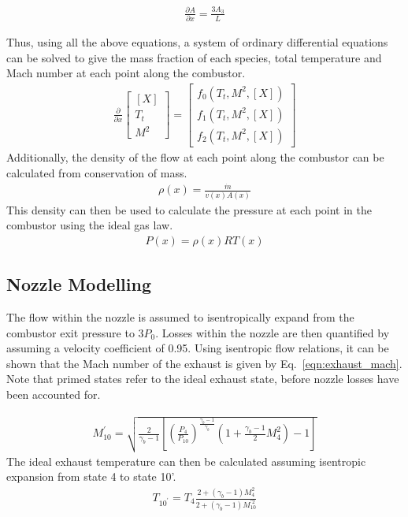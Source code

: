 \documentclass[a4paper]{article}
\begin{document}
\begin{align}
    \frac{\partial A}{\partial x} = \frac{3A_3}{L}
\end{align}

Thus, using all the above equations, a system of ordinary differential equations can be solved to give the mass fraction of each species, total temperature and Mach number at each point along the combustor.
\begin{align}
    \frac{\partial}{\partial x} 
    \begin{bmatrix}
    \left[ X \right] \\
    T_t\\
    M^2
    \end{bmatrix}
    =
    \begin{bmatrix}
        f_0 \left(T_t, M^2, \left[ X \right]\right)\\
        f_1 \left(T_t, M^2, \left[ X \right]\right)\\
        f_2 \left(T_t, M^2, \left[ X \right]\right)
    \end{bmatrix}
\end{align}
Additionally, the density of the flow at each point along the combustor can be calculated from conservation of mass.
\begin{align}
    \rho(x) = \frac{\dot{m}}{v(x) A(x)}
\end{align}
This density can then be used to calculate the pressure at each point in the combustor using the ideal gas law.
\begin{align}
    P(x) = \rho(x) R T(x)
\end{align}

\subsection{Nozzle Modelling}\label{subsec:nozzle_modelling}
The flow within the nozzle is assumed to isentropically expand from the combustor exit pressure to \(3P_0\). Losses within the nozzle are then quantified by assuming a velocity coefficient of 0.95. Using isentropic flow relations, it can be shown that the Mach number of the exhaust is given by Eq.~\ref{eqn:exhaust_mach}. Note that primed states refer to the ideal exhaust state, before nozzle losses have been accounted for.

\begin{align}\label{eqn:exhaust_mach}
    M_{10}^\prime = \sqrt{\frac{2}{\gamma_b - 1} \left[ \left(\frac{P_4}{P_{10}} \right)^{\frac{\gamma_b-1}{\gamma_b}}\left( 1 + \frac{\gamma_b - 1}{2}M_4^2 \right) - 1 \right]}
\end{align}
The ideal exhaust temperature can then be calculated assuming isentropic expansion from state 4 to state 10'.
\begin{align}\label{eqn:T10_dash}
    T_{10^\prime} = T_4 \frac{2 + (\gamma_b - 1) M_4^2}{2 + (\gamma_b - 1) M_{10}^{\prime 2}}
\end{align}
\end{document}

